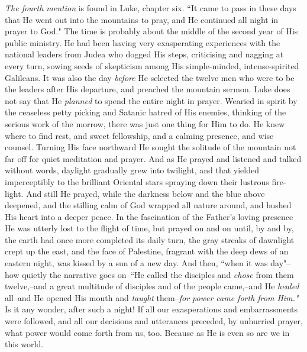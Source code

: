\textit{The fourth mention} is found in Luke, chapter six. ``It came to pass in
these days that He went out into the mountains to pray, and He continued
all night in prayer to God." The time is probably about the middle of the
second year of His public ministry. He had been having very exasperating
experiences with the national leaders from Judea who dogged His steps,
criticising and nagging at every turn, sowing seeds of skepticism among
His simple-minded, intense-spirited Galileans. It was also the day
\textit{before} He selected the twelve men who were to be the leaders after His
departure, and preached the mountain sermon. Luke does not say that He
\textit{planned} to spend the entire night in prayer. Wearied in spirit by the
ceaseless petty picking and Satanic hatred of His enemies, thinking of the
serious work of the morrow, there was just one thing for Him to do. He
knew where to find rest, and sweet fellowship, and a calming presence, and
wise counsel. Turning His face northward He sought the solitude of the
mountain not far off for quiet meditation and prayer. And as He prayed and
listened and talked without words, daylight gradually grew into twilight,
and that yielded imperceptibly to the brilliant Oriental stars spraying
down their lustrous fire-light. And still He prayed, while the darkness
below and the blue above deepened, and the stilling calm of God wrapped
all nature around, and hushed His heart into a deeper peace. In the
fascination of the Father's loving presence He was utterly lost to the
flight of time, but prayed on and on until, by and by, the earth had once
more completed its daily turn, the gray streaks of dawnlight crept up the
east, and the face of Palestine, fragrant with the deep dews of an
eastern night, was kissed by a sun of a new day. And then, ``when it was
day"--how quietly the narrative goes on--``He called the disciples and
\textit{chose} from them twelve,--and a great multitude of disciples and of the
people came,--and He \textit{healed} all--and He opened His mouth and \textit{taught}
them--\textit{for power came forth from Him."} Is it any wonder, after such a
night! If all our exasperations and embarrassments were followed, and all
our decisions and utterances preceded, by unhurried prayer, what power
would come forth from us, too. Because as He is even so are we in this
world.

